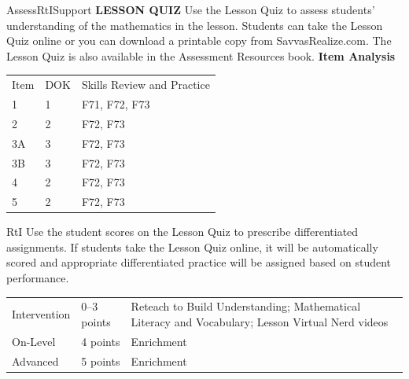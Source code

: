 \documentclass{article}
\newenvironment{te-addendum}[2]{}{}     %
\begin{document}
\begin{te-addendum}{Assess}{RtISupport}
\textbf{LESSON QUIZ}
Use the Lesson Quiz to assess students' understanding of the mathematics in the lesson.
Students can take the Lesson Quiz online or you can download a printable copy from SavvasRealize.com. The Lesson Quiz is also available in the Assessment Resources book.
\textbf{Item Analysis}
\begin{tabular}{lll}
Item & DOK & Skills Review and Practice \\
1 & 1 & F71, F72, F73 \\
2 & 2 & F72, F73 \\
3A & 3 & F72, F73 \\
3B & 3 & F72, F73 \\
4 & 2 & F72, F73 \\
5 & 2 & F72, F73 \\
\end{tabular}
RtI Use the student scores on the Lesson Quiz to prescribe differentiated assignments.
If students take the Lesson Quiz online, it will be automatically scored and appropriate differentiated practice will be assigned based on student performance.
\begin{tabular}{lll}
Intervention & 0--3 points & Reteach to Build Understanding; Mathematical Literacy and Vocabulary; Lesson Virtual Nerd videos \\
On-Level & 4 points & Enrichment \\
Advanced & 5 points & Enrichment \\
\end{tabular}
\end{te-addendum}
\end{document}

